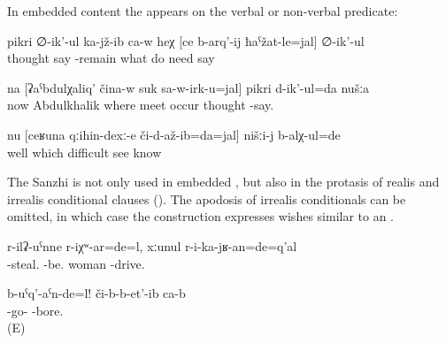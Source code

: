 In embedded content  the  appears on the verbal or non-verbal predicate:

\begin{exe}
	\ex	\label{ex:He is thinking, sitting, about what must be done}
	\gll	pikri	∅-ik'-ul	ka-jž-ib	ca-w	heχ	[ce		b-arq'-ij	ħaˁžat-le=jal]	∅-ik'-ul\\
		thought	say	-remain			what	do	need	say\\
	\glt	{}

	\ex	\label{ex:‎‎‎We are thinking where to meet Abdulkhalik}
	\gll	na	[ʡaˁbdulχaliq'	čina-w	suk	sa-w-irk-u=jal]	pikri	d-ik'-ul=da	nušːa	\\
		now	Abdulkhalik	where	meet	occur	thought	-say.	\\
	\glt	{}

	\ex	\label{ex:‎Well we knew which difficulties we had seen}
	\gll	nu	[ceʁuna	qːihin-dexː-e	či-d-až-ib=da=jal]	nišːi-j	b-alχ-ul=de\\
		well	which	difficult	see		know\\
	\glt	{}
\end{exe}

The Sanzhi  is not only used in embedded , but also in the protasis of realis and irrealis conditional clauses  (). The apodosis of irrealis conditionals can be omitted, in which case the construction expresses wishes similar to an  .

\begin{exe}
	\ex	\label{ex:If the woman would have stolen, they would/should have imprisoned her}
	\gll	r-ilʡ-uˁnne	r-iχʷ-ar=de=l,	xːunul r-i-ka-jʁ-an=de=q'al\\
		-steal.	-be.	woman -drive. \\
	\glt	{}
		
	\ex	\label{ex:If they would go! They bore (me).}
	\gll	b-uˁq'-aˁn-de=l!	či-b-b-et'-ib	ca-b\\
		-go-	-bore.	 \\
	\glt	{} (E)
\end{exe}


